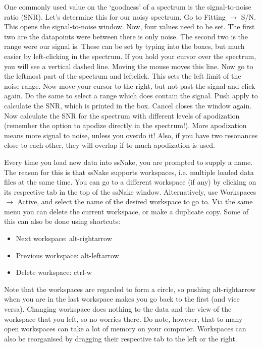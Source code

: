 \documentclass[11pt,a4paper]{article}
\begin{document}
One commonly used value on the `goodness' of a spectrum is the signal-to-noise ratio (SNR). Let's
determine this for our noisy spectrum. Go to Fitting $\rightarrow$ S/N. This opens the
signal-to-noise window. Now, four values need to be set. The first two are the datapoints were
between there is only noise. The second two is the range were our signal is. These can be set by
typing into the boxes, but much easier by left-clicking in the spectrum. If you hold your cursor
over the spectrum, you will see a vertical dashed line. Moving the mouse moves this line. Now go to
the leftmost part of the spectrum and leftclick. This sets the left limit of the noise range. Now
move your cursor to the right, but not past the signal and click again. Do the same to select a
range which does contain the signal. Push apply to calculate the SNR, which is printed in the box.
Cancel closes the window again. Now calculate the SNR for the spectrum with different levels of
apodization (remember the option to apodize directly in the spectrum!). More apodization means more
signal to noise, unless you overdo it! Also, if you have two resonances close to each other, they
will overlap if to much apodization is used.


\begin{tcolorbox}[breakable,colback=green!5,colframe=MyGreenD,title=\large ssNake workspaces,boxrule=2mm,colback=MyGreenD!30!white]
Every time you load new data into ssNake, you are prompted to supply a name. The reason for this is that ssNake supports workspaces, i.e. multiple loaded data files at the same time. You can go to a different workspace (if any) by clicking on its respective tab in the top of the ssNake window. Alternatively, use Workspaces $\rightarrow$ Active, and select the name of the desired workspace to go to. Via the same menu you can delete the current workspace, or make a duplicate copy. Some of this can also be done using shortcuts:
\begin{itemize}
\item Next workspace: alt-rightarrow
\item Previous workspace: alt-leftarrow
\item Delete workspace: ctrl-w
\end{itemize}
Note that the workspaces are regarded to form a circle, so pushing alt-rightarrow when you are in the last workspace makes you go back to the first (and vice versa). Changing workspace does nothing to the data and the view of the workspace that you left, so no worries there. Do note, however, that to many open workspaces can take a lot of memory on your computer. Workspaces can also be reorganised by dragging their respective tab to the left or the right.
\end{tcolorbox}
\end{document}
